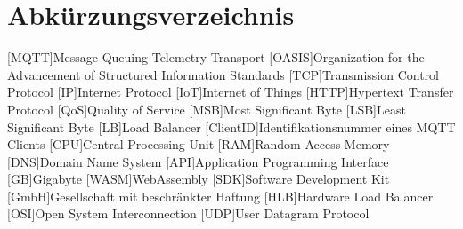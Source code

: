 

\section*{Abkürzungsverzeichnis}
\begin{acronym}[xxxxxxxxxx] %
    [MQTT]{Message Queuing Telemetry Transport}
    [OASIS]{Organization for the Advancement of Structured Information Standards}
    [TCP]{Transmission Control Protocol}
    [IP]{Internet Protocol}
    [IoT]{Internet of Things}
    [HTTP]{Hypertext Transfer Protocol}
    [QoS]{Quality of Service}
    [MSB]{Most Significant Byte}
    [LSB]{Least Significant Byte}
    [LB]{Load Balancer}
    [ClientID]{Identifikationsnummer eines MQTT Clients}
    [CPU]{Central Processing Unit}
    [RAM]{Random-Access Memory}
    [DNS]{Domain Name System}
    [API]{Application Programming Interface}
    [GB]{Gigabyte}
    [WASM]{WebAssembly}
    [SDK]{Software Development Kit}
    [GmbH]{Gesellschaft mit beschränkter Haftung}
    [HLB]{Hardware Load Balancer}
    [OSI]{Open System Interconnection}
    [UDP]{User Datagram Protocol}
\end{acronym}
